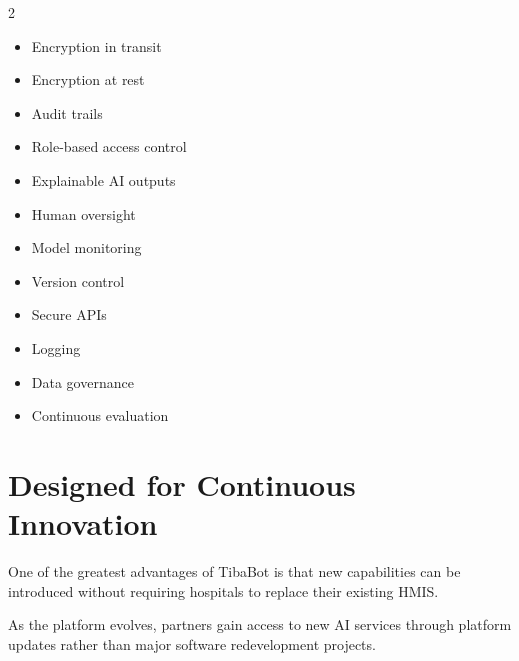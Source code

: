\vspace{4mm}

\begin{partnerbox}

\begin{multicols}{2}

\begin{itemize}

\item Encryption in transit

\item Encryption at rest

\item Audit trails

\item Role-based access control

\item Explainable AI outputs

\item Human oversight

\item Model monitoring

\item Version control

\item Secure APIs

\item Logging

\item Data governance

\item Continuous evaluation

\end{itemize}

\end{multicols}

\end{partnerbox}


\section{Designed for Continuous Innovation}

One of the greatest advantages of TibaBot is that new capabilities can be introduced without requiring hospitals to replace their existing HMIS.

As the platform evolves, partners gain access to new AI services through platform updates rather than major software redevelopment projects.

